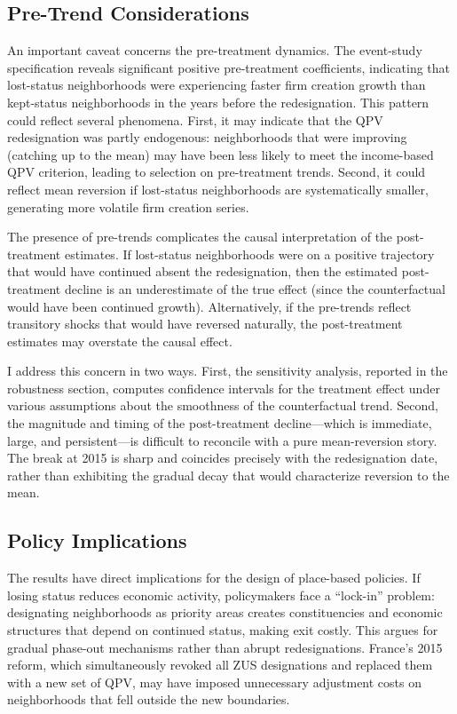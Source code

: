 \documentclass[12pt]{article}
\begin{document}
\subsection{Pre-Trend Considerations}

An important caveat concerns the pre-treatment dynamics. The event-study specification reveals significant positive pre-treatment coefficients, indicating that lost-status neighborhoods were experiencing faster firm creation growth than kept-status neighborhoods in the years before the redesignation. This pattern could reflect several phenomena. First, it may indicate that the QPV redesignation was partly endogenous: neighborhoods that were improving (catching up to the mean) may have been less likely to meet the income-based QPV criterion, leading to selection on pre-treatment trends. Second, it could reflect mean reversion if lost-status neighborhoods are systematically smaller, generating more volatile firm creation series.

The presence of pre-trends complicates the causal interpretation of the post-treatment estimates. If lost-status neighborhoods were on a positive trajectory that would have continued absent the redesignation, then the estimated post-treatment decline is an underestimate of the true effect (since the counterfactual would have been continued growth). Alternatively, if the pre-trends reflect transitory shocks that would have reversed naturally, the post-treatment estimates may overstate the causal effect.

I address this concern in two ways. First, the \citet{rambachan2023more} sensitivity analysis, reported in the robustness section, computes confidence intervals for the treatment effect under various assumptions about the smoothness of the counterfactual trend. Second, the magnitude and timing of the post-treatment decline---which is immediate, large, and persistent---is difficult to reconcile with a pure mean-reversion story. The break at 2015 is sharp and coincides precisely with the redesignation date, rather than exhibiting the gradual decay that would characterize reversion to the mean.

\subsection{Policy Implications}

The results have direct implications for the design of place-based policies. If losing status reduces economic activity, policymakers face a ``lock-in'' problem: designating neighborhoods as priority areas creates constituencies and economic structures that depend on continued status, making exit costly. This argues for gradual phase-out mechanisms rather than abrupt redesignations. France's 2015 reform, which simultaneously revoked all ZUS designations and replaced them with a new set of QPV, may have imposed unnecessary adjustment costs on neighborhoods that fell outside the new boundaries.
\end{document}
